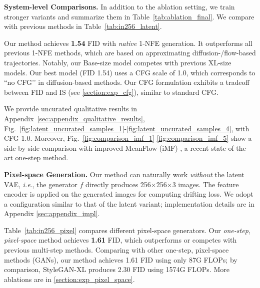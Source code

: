 \documentclass{article}
\renewcommand{\paragraph}[1]{\vspace{.05em}\noindent\textbf{#1}}
\def\onedot{.}
\def\ie{\emph{i.e}\onedot} \def\Ie{\emph{I.e}\onedot}
\theoremstyle{plain}
\theoremstyle{definition}
\theoremstyle{remark}
\begin{document}

\paragraph{System-level Comparisons.} In addition to the ablation setting, we train stronger variants and summarize them in Table~\ref{tab:ablation_final}.
We compare with previous methods in Table~\ref{tab:in256_latent}.

Our method achieves \textbf{1.54} FID with \textit{native} 1-NFE generation. It outperforms all previous 1-NFE methods, which are based on approximating diffusion-/flow-based trajectories.
Notably, our Base-size model competes with previous XL-size models.
Our best model (FID 1.54) uses a CFG scale of 1.0, which corresponds to ``no CFG’’ in diffusion-based methods.
Our CFG formulation exhibits a tradeoff between FID and IS (see \ref{section:exp_cfg}), similar to standard CFG.


We provide uncurated qualitative results in Appendix~\ref{sec:appendix_qualitative_results}, Fig.~\ref{fig:latent_uncurated_samples_1}-\ref{fig:latent_uncurated_samples_4}, with CFG 1.0.
Moreover, Fig.~\ref{fig:comparison_imf_1}-\ref{fig:comparison_imf_5} show a side-by-side comparison with improved MeanFlow (iMF) \cite{geng2025improved}, a recent state-of-the-art one-step method.

\paragraph{Pixel-space Generation.} Our method can naturally work \textit{without} the latent VAE, \ie, the generator $f$ directly produces 256$\times$256$\times$3 images. The feature encoder is applied on the generated images for computing drifting loss. We adopt a configuration similar to that of the latent variant; implementation details are in Appendix \ref{sec:appendix_impl}.

Table~\ref{tab:in256_pixel} compares different pixel-space generators.
Our \textit{one-step}, \textit{pixel-space} method achieves \textbf{1.61} FID, which outperforms or competes with previous multi-step methods.
Comparing with other one-step, pixel-space methods (GANs), our method achieves 1.61 FID using only 87G FLOPs; by comparison, StyleGAN-XL produces 2.30 FID using 1574G FLOPs.
More ablations are in \ref{section:exp_pixel_space}.
\end{document}
